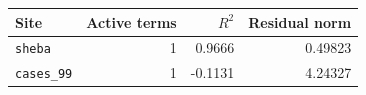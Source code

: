 \begin{tabular}{l r r r}
\toprule
Site & Active terms & $R^{2}$ & Residual norm \\
\midrule
\texttt{sheba} & 1 & 0.9666 & 0.49823 \\
\texttt{cases\_99} & 1 & -0.1131 & 4.24327 \\
\bottomrule
\end{tabular}
